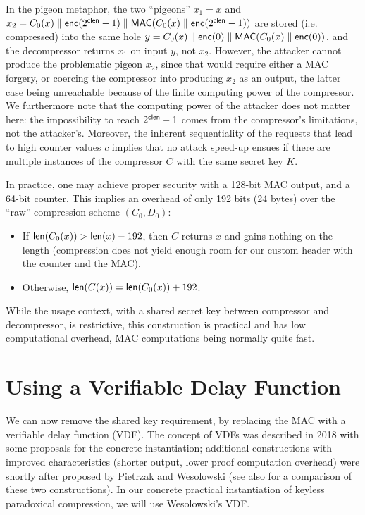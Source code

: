 \documentclass{llncs}
\newcommand{\bitlength}{\text{\textsf{len}}}
\newcommand{\MAC}{\text{\textsf{MAC}}}
\newcommand{\cc}{\text{\textsf{enc}}}
\newcommand{\cclen}{\text{\textsf{clen}}}
\begin{document}
In the pigeon metaphor, the two ``pigeons'' $x_1 = x$ and $x_2 = C_0(x)
\parallel \cc(2^{\cclen} - 1) \parallel \MAC(C_0(x) \parallel
\cc(2^{\cclen} - 1))$ are stored (i.e. compressed) into the same hole $y
= C_0(x) \parallel \cc(0) \parallel \MAC(C_0(x) \parallel \cc(0))$, and
the decompressor returns $x_1$ on input $y$, not $x_2$. However, the
attacker cannot produce the problematic pigeon $x_2$, since that would
require either a MAC forgery, or coercing the compressor into producing
$x_2$ as an output, the latter case being unreachable because of the
finite computing power of the compressor. We furthermore note that the
computing power of the attacker does not matter here: the impossibility
to reach $2^{\cclen}-1$ comes from the compressor's limitations, not the
attacker's. Moreover, the inherent sequentiality of the requests that
lead to high counter values $c$ implies that no attack speed-up ensues
if there are multiple instances of the compressor $C$ with the same
secret key $K$.

In practice, one may achieve proper security with a 128-bit MAC output,
and a 64-bit counter. This implies an overhead of only 192 bits (24 bytes)
over the ``raw'' compression scheme $(C_0, D_0)$:
\begin{itemize}

    \item If $\bitlength(C_0(x)) > \bitlength(x) - 192$, then $C$
    returns $x$ and gains nothing on the length (compression does not
    yield enough room for our custom header with the counter and the MAC).

    \item Otherwise, $\bitlength(C(x)) = \bitlength(C_0(x)) + 192$.

\end{itemize}
While the usage context, with a shared secret key between compressor and
decompressor, is restrictive, this construction is practical and has
low computational overhead, MAC computations being normally quite fast.

\section{Using a Verifiable Delay Function}\label{sec:withvdf}

We can now remove the shared key requirement, by replacing the MAC with
a verifiable delay function (VDF). The concept of VDFs was described in
2018\cite{BonBonBunFis2018} with some proposals for the concrete
instantiation; additional constructions with improved characteristics
(shorter output, lower proof computation overhead) were shortly after
proposed by Pietrzak\cite{Pie2019} and Wesolowski\cite{Wes2019} (see
also \cite{BonBunFis2018} for a comparison of these two constructions).
In our concrete practical instantiation of keyless paradoxical
compression, we will use Wesolowski's VDF.
\end{document}
